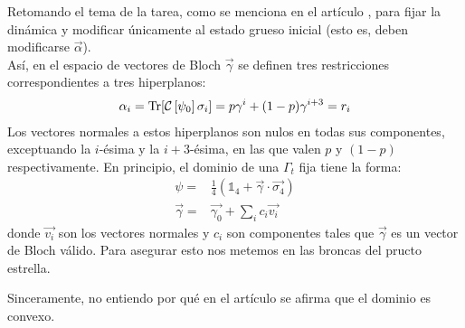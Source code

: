 \documentclass[onecolumn,11pt]{article}
\newcommand{\mcC}{\mathcal{C}}
\newcommand{\Id}{\mathds{1}}%
\newcommand{\CG}[1]{\mcC\left[#1\right]}
\begin{document}
Retomando el tema de la tarea, como se menciona en el artículo \cite{CGEmergingDynamics}, para fijar la dinámica y modificar únicamente al estado grueso inicial (esto es, deben modificarse $\vec{\alpha}$).\\
Así, en el espacio de vectores de Bloch $\vec{\gamma}$ se definen tres restricciones correspondientes a tres hiperplanos:
\begin{align}
\alpha_{i}=\Tr[\CG{\psi_{0}}\sigma_{i}]=p\gamma^{i}+(1-p)\gamma^{i+3}=r_{i}
\end{align}
Los vectores normales a estos hiperplanos son nulos en todas sus componentes, exceptuando la $i$-ésima y la $i+3$-ésima, en las que valen $p$ y $(1-p)$ respectivamente. En principio, el dominio de una $\Gamma_{t}$ fija tiene la forma:
\begin{align}
\psi=&\frac{1}{4}\left( \Id_{4}+\vec{\gamma}\cdot\vec{\sigma_{4}} \right)\\
\vec{\gamma}=&\vec{\gamma_{0}}+\sum_{i}c_{i}\vec{v_{i}}
\end{align}
donde $\vec{v_{i}}$ son los vectores normales y $c_{i}$ son componentes tales que $\vec{\gamma}$ es un vector de Bloch válido. Para asegurar esto nos metemos en las broncas del pructo estrella.



Sinceramente, no entiendo por qué en el artículo se afirma que el dominio es convexo.


\end{document}
